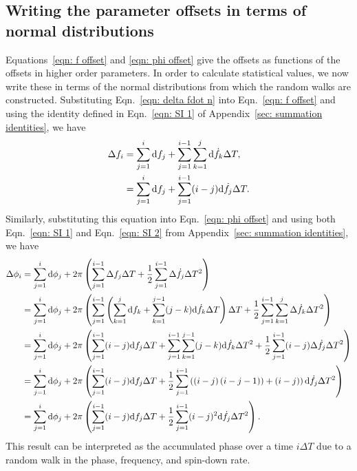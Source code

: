 \documentclass[../full_thesis/full_thesis.tex]{subfiles}
\begin{document}
\subsection{Writing the parameter offsets in terms of normal distributions}
Equations~\eqref{eqn: f offset} and \eqref{eqn: phi offset} give the offsets as
functions of the offsets in higher order parameters. In order to calculate
statistical values, we now write these in terms of the normal distributions
from which the random walks are constructed.  Substituting Eqn.~\eqref{eqn:
delta fdot n} into Eqn.~\eqref{eqn: f offset} and using the identity defined
in Eqn.~\eqref{eqn: SI 1} of Appendix~\ref{sec: summation identities}, we have
\begin{align}
\Delta f_{i}  & = \sum_{j=1}^{i}\mathrm{d} f_{j}
+ \sum_{j=1}^{i-1}\sum_{k=1}^{j}\mathrm{d} \dot{f}_{k} \Delta T ,  \\
& = \sum_{j=1}^{i}\mathrm{d} f_{j}
+ \sum_{j=1}^{i-1}(i-j)\mathrm{d} \dot{f}_{j} \Delta T .
\label{eqn: delta f n}
\end{align}
Similarly, substituting this equation into Eqn.~\eqref{eqn: phi offset} and
using both Eqn.~\eqref{eqn: SI 1} and Eqn.~\eqref{eqn: SI 2} from
Appendix~\ref{sec: summation identities}, we have
\begin{align}
\begin{split}
\Delta\phi_{i} & = \sum_{j=1}^{i}\mathrm{d} \phi_{j}
+ 2\pi \left(\sum_{j=1}^{i-1}\Delta f_{j}\Delta T
+ \frac{1}{2}\sum_{j=1}^{i-1}\Delta\dot{f}_{j}\Delta T^{2}\right) \\
& = \sum_{j=1}^{i}\mathrm{d} \phi_{j} + 2\pi\left(\sum_{j=1}^{i-1}\left(\sum_{k=1}^{j}\mathrm{d}f_{k}
+ \sum_{k=1}^{j-1}(j-k)\mathrm{d}\dot{f}_{k}\Delta T\right)\Delta T
 + \frac{1}{2}\sum_{j=1}^{i-1}\sum_{k=1}^{j}\Delta\dot{f}_{k}\Delta T^{2} \right)  \\
& = \sum_{j=1}^{i}\mathrm{d} \phi_{j} + 2\pi\left(\sum_{j=1}^{i-1}(i-j)\mathrm{d}f_{j}\Delta T
 + \sum_{j=1}^{i-1}\sum_{k=1}^{j-1}(j-k)\mathrm{d}\dot{f}_{k}\Delta T^{2}
 + \frac{1}{2}\sum_{j=1}^{i-1}(i-j)\Delta\dot{f}_{j}\Delta T^{2} \right)  \\
& = \sum_{j=1}^{i}\mathrm{d} \phi_{j} + 2\pi\left(\sum_{j=1}^{i-1}(i-j)\mathrm{d}f_{j}\Delta T
 + \frac{1}{2}\sum_{j=1}^{i-1}\left(\left(i-j\right)\left(i-j-1)\right)
 + (i-j)\right)\mathrm{d}\dot{f}_{j}\Delta T^{2}\right)  \\
& = \sum_{j=1}^{i}\mathrm{d} \phi_{j} + 2\pi\left(\sum_{j=1}^{i-1}(i-j)\mathrm{d}f_{j}\Delta T
 + \frac{1}{2}\sum_{j=1}^{i-1}(i-j)^{2}\mathrm{d}\dot{f}_{j}\Delta T^{2}\right).
\end{split}
\label{eqn: delta phi n}
\end{align}
This result can be interpreted as the accumulated phase over a time $i\Delta
T$ due to a random walk in the phase, frequency, and spin-down rate.
\end{document}
